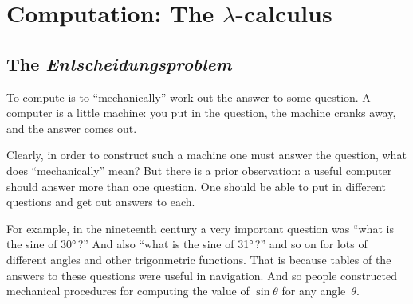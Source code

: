 \documentclass{article}
\begin{document}
\section{Computation: The $\lambda$-calculus}

\subsection{The \emph{Entscheidungsproblem}}

To compute is to ``mechanically'' work out the answer to some question. A computer is a little machine: you put in the question, the machine cranks away, and the answer comes out.  
\begin{marginfigure}
  \caption{A computer. Questions go in; answers come out.\label{fig:computer}}
  \begin{center}
  \end{center}

\end{marginfigure}

Clearly, in order to construct such a machine one must answer the question, what does ``mechanically'' mean?  But there is a prior observation: a useful computer should answer more than one question. One should be able to put in different questions and get out answers to each.  

For example, in the nineteenth century a very important question was ``what is the sine of \ang{30}\,?'' And also ``what is the sine of \ang{31}\,?'' and so on for lots of different angles and other trigonmetric functions.  That is because tables of the answers to these questions were useful in navigation. And so people constructed mechanical procedures for computing the value of $\sin\theta$ for any angle~$\theta$.
\end{document}
